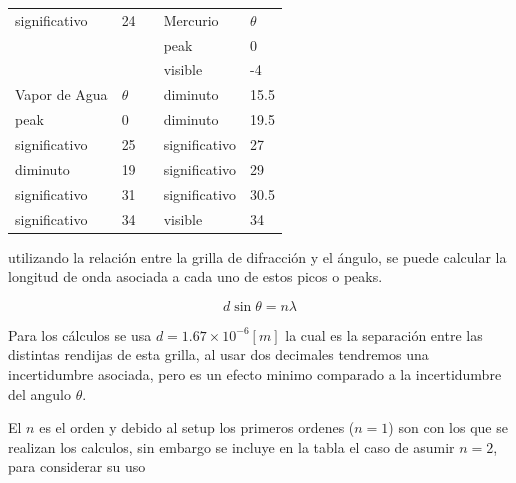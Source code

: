 \documentclass[a4paper,twocolumn,10pt]{article}
\begin{document}
\begin{table}[H]
\begin{tabular}{lllll}
significativo                   & 24                                          &  & {\cellcolor{cyan}}Mercurio & {\cellcolor{cyan}}$\theta$  \\
                                &                                             &  & peak                       & 0                                            \\
                                &                                             &  & visible                    & -4                                           \\
{\cellcolor{cyan}}Vapor de Agua & {\cellcolor{cyan}}$\theta$ &  & diminuto                   & 15.5                                         \\
peak                            & 0                                           &  & diminuto                   & 19.5                                         \\
significativo                   & 25                                          &  & significativo              & 27                                           \\
diminuto                        & 19                                          &  & significativo              & 29                                           \\
significativo                   & 31                                          &  & significativo              & 30.5                                         \\
significativo                   & 34                                          &  & visible                    & 34                                          
\end{tabular}
\end{table}


utilizando la relación entre la grilla de difracción y el ángulo, se puede calcular la longitud de onda asociada a cada uno de estos picos o peaks.

$$
d \sin \theta = n \lambda
$$

Para los cálculos se usa $d=1.67 \times 10^{-6} [m]$ la cual es la separación entre las distintas rendijas de esta grilla, al usar dos decimales tendremos una incertidumbre asociada, pero es un efecto minimo comparado a la incertidumbre del angulo $\theta$.

El $n$ es el orden y debido al setup los primeros ordenes ($n=1$) son con los que se realizan los calculos, sin embargo se incluye en la tabla el caso de asumir $n=2$, para considerar su uso
\end{document}
